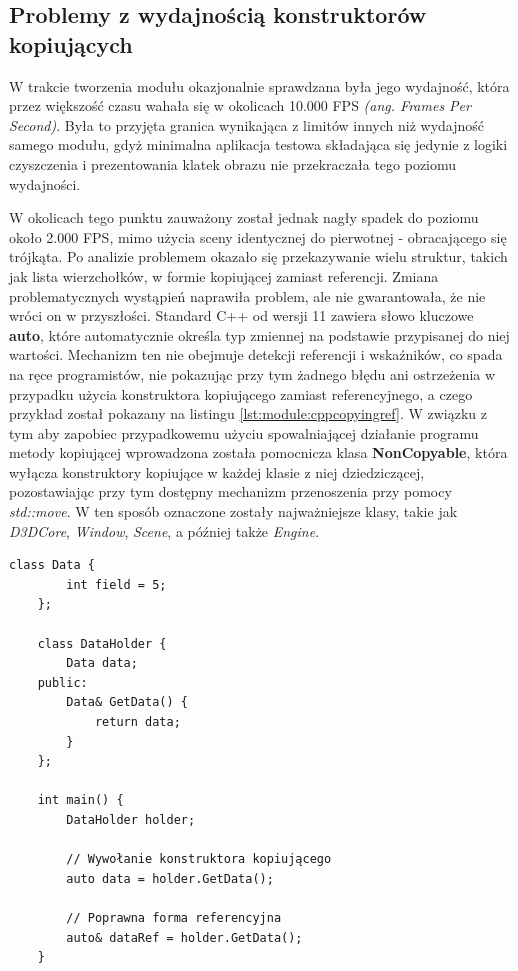 \subsection{Problemy z wydajnością konstruktorów kopiujących}
W trakcie tworzenia modułu okazjonalnie sprawdzana była jego wydajność, która przez większość czasu wahała się w okolicach 10.000 FPS \textit{(ang. Frames Per Second)}. Była to przyjęta granica wynikająca z limitów innych niż wydajność samego modułu, gdyż minimalna aplikacja testowa składająca się jedynie z logiki czyszczenia i prezentowania klatek obrazu nie przekraczała tego poziomu wydajności. 

W okolicach tego punktu zauważony został jednak nagły spadek do poziomu około 2.000 FPS, mimo użycia sceny identycznej do pierwotnej - obracającego się trójkąta. Po analizie problemem okazało się przekazywanie wielu struktur, takich jak lista wierzchołków, w formie kopiującej zamiast referencji. Zmiana problematycznych wystąpień naprawiła problem, ale nie gwarantowała, że nie wróci on w przyszłości. Standard C++ od wersji 11 zawiera słowo kluczowe \textbf{auto}, które automatycznie określa typ zmiennej na podstawie przypisanej do niej wartości. Mechanizm ten nie obejmuje detekcji referencji i wskaźników, co spada na ręce programistów, nie pokazując przy tym żadnego błędu ani ostrzeżenia w przypadku użycia konstruktora kopiującego zamiast referencyjnego, a czego przykład został pokazany na listingu \ref{lst:module:cppcopyingref}. W związku z tym aby zapobiec przypadkowemu użyciu spowalniającej działanie programu metody kopiującej wprowadzona została pomocnicza klasa \textbf{NonCopyable}, która wyłącza konstruktory kopiujące w każdej klasie z niej dziedziczącej, pozostawiając przy tym dostępny mechanizm przenoszenia przy pomocy \textit{std::move}. W ten sposób oznaczone zostały najważniejsze klasy, takie jak \textit{D3DCore}, \textit{Window}, \textit{Scene}, a później także \textit{Engine}. 

\begin{lstlisting}[caption={Przykład sytuacji, w której łatwym jest użycie formy kopiującej zamiast referencji, co skutkuje dużym kosztem wydajnościowym.}, label={lst:module:cppcopyingref}]
	class Data {
		int field = 5;
	};
	
	class DataHolder {
		Data data;	
	public:
		Data& GetData() {
			return data;
		}
	};

	int main() {
		DataHolder holder;

		// Wywołanie konstruktora kopiującego
		auto data = holder.GetData();

		// Poprawna forma referencyjna
		auto& dataRef = holder.GetData();
	}	
\end{lstlisting}

